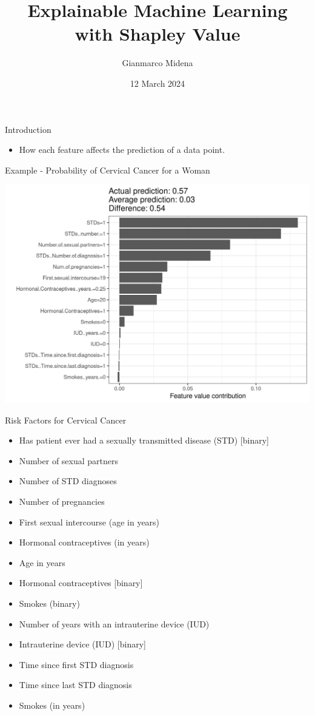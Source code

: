 \documentclass[dvipsnames]{beamer}
\title[XAI with Shapley Value]
{Explainable Machine Learning\\with Shapley Value}
\author{Gianmarco Midena}
\institute{Aalto University}
\date{12 March 2024}
\begin{document}
\begin{frame}
\titlepage
\end{frame}


\begin{frame}{Introduction}
	\begin{itemize}
		\item How each feature affects the prediction of a data point.
	\end{itemize}
\end{frame}

\begin{frame}{Example - Probability of Cervical Cancer for a Woman}
	\begin{center}
		\includegraphics[scale=0.6]{images/shapley-cervical-plot-1.jpeg}
	\end{center}
\end{frame}

\begin{frame}{Risk Factors for Cervical Cancer}
\begin{itemize}
	\item Has patient ever had a sexually transmitted disease (STD) [binary]
	\item Number of sexual partners
	\item Number of STD diagnoses
	\item Number of pregnancies
	\item First sexual intercourse (age in years)
	\item Hormonal contraceptives (in years)
	\item Age in years
	\item Hormonal contraceptives [binary]
	\item Smokes (binary)
	\item Number of years with an intrauterine device (IUD)
	\item Intrauterine device (IUD) [binary]
	\item Time since first STD diagnosis
	\item Time since last STD diagnosis
	\item Smokes (in years)
\end{itemize}
\end{frame}
\end{document}
